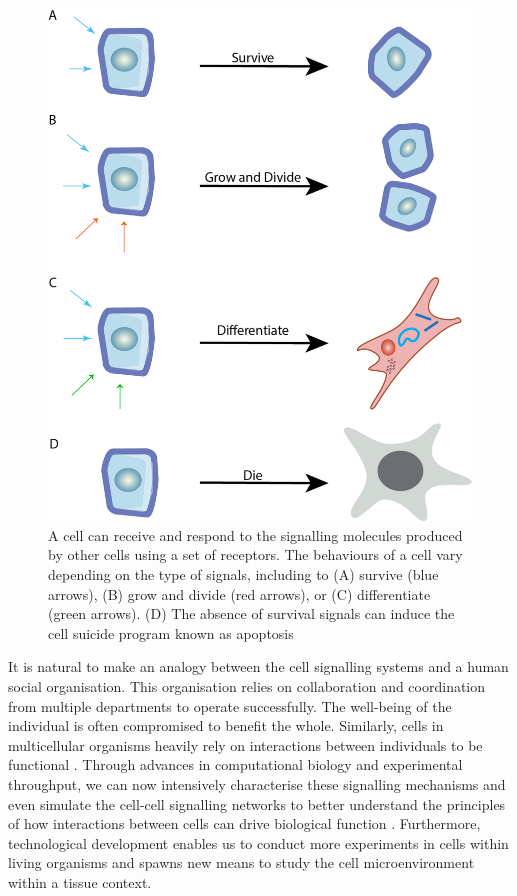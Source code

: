 \begin{figure}[htp]
    \centering
    \includegraphics[width=0.6\columnwidth]{Chapter1/Figures/Chap1_figure1.png}
    \caption[Cell relies on multiple extracellular signalling molecules to survive.]{A cell can receive and respond to the signalling molecules produced by other cells using a set of receptors. The behaviours of a cell vary depending on the type of signals, including to (A) survive (blue arrows), (B) grow and divide (red arrows), or (C) differentiate (green arrows). (D) The absence of survival signals can induce the cell suicide program known as apoptosis}
    \label{fig:Chap1_figure1}
\end{figure}

It is natural to make an analogy between the cell signalling systems and a human social organisation. This organisation relies on collaboration and coordination from multiple departments to operate successfully. The well-being of the individual is often compromised to benefit the whole. Similarly, cells in multicellular organisms heavily rely on interactions between individuals to be functional \cite{bartee2018principles}. Through advances in computational biology and experimental throughput, we can now intensively characterise these signalling mechanisms and even simulate the cell-cell signalling networks to better understand the principles of how interactions between cells can drive biological function \cite{sprinzak2010cis, teague2016synthetic, toda2019engineering}. Furthermore, technological development enables us to conduct more experiments in cells within living organisms \cite{helmchen2005deep, periasamy2013methods} and spawns new means to study the cell microenvironment within a tissue context. 


